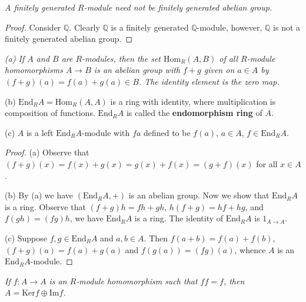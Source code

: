 \begin{problem}\em
A finitely generated $R$-module need not be finitely generated abelian group.
\end{problem}
\begin{proof}
Consider $\mathbb{Q}$. Clearly $\mathbb{Q}$ is a finitely generated $\mathbb{Q}$-module, however, $\mathbb{Q}$ is not a finitely generated abelian group.
\end{proof}
\begin{problem}\em
(a) If $A$ and $B$ are $R$-modules, then the set $\mathrm{Hom}_R(A,B)$ of all $R$-module homomorphisms $A\to B$ is an abelian group with $f+g$ given on $a\in A$ by $(f+g)(a)=f(a)+g(a)\in B$. The identity element is the zero map.\par
(b) $\mathrm{End}_RA=\mathrm{Hom}_R(A,A)$ is a ring with identity, where multiplication is composition of functions. $\mathrm{End}_RA$ is called the \textbf{endomorphism ring} of $A$.\par
(c) $A$ is a left $\mathrm{End}_RA$-module with $fa$ defined to be $f(a)$, $a\in A$, $f\in\mathrm{End}_RA$.
\end{problem}
\begin{proof}
(a) Observe that $(f+g)(x)=f(x)+g(x)=g(x)+f(x)=(g+f)(x)$ for all $x\in A$.\par
(b) By (a) we have $(\mathrm{End}_RA,+)$ is an abelian group. Now we show that $\mathrm{End}_RA$ is a ring. Observe that $(f+g)h=fh+gh$, $h(f+g)=hf+hg$, and $f(gh)=(fg)h$, we have $\mathrm{End}_RA$ is a ring. The identity of $\mathrm{End}_RA$ is $1_{A\to A}$.\par
(c) Suppose $f,g\in\mathrm{End}_RA$ and $a,b\in A$. Then $f(a+b)=f(a)+f(b)$, $(f+g)(a)=f(a)+g(a)$ and $f(g(a))=(fg)(a)$, whence $A$ is an $\mathrm{End}_RA$-module.
\end{proof}
\begin{problem}\em
If $f:A\to A$ is an $R$-module homomorphism such that $ff=f$, then $A=\mathrm{Ker}f\oplus\mathrm{Im}f$.
\end{problem}
